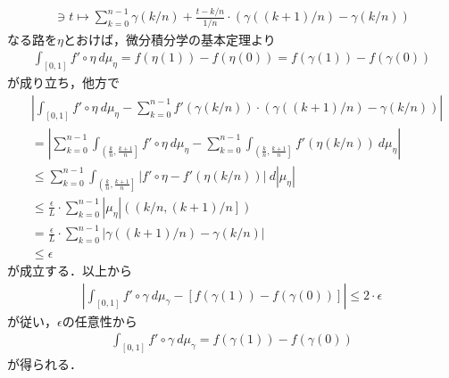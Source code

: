 \begin{sketch}
		\begin{align}
			[0,1] \ni t \longmapsto \sum_{k=0}^{n-1} \gamma(k/n) + \frac{t - k/n}{1/n} \cdot \left(\gamma((k+1)/n) - \gamma(k/n)\right)
		\end{align}
		なる路を$\eta$とおけば，微分積分学の基本定理より
		\begin{align}
			\int_{[0,1]} f' \circ \eta\ d\mu_{\eta} = f(\eta(1)) - f(\eta(0))
			= f(\gamma(1)) - f(\gamma(0))
		\end{align}
		が成り立ち，他方で
		\begin{align}
			&\left|\int_{[0,1]} f' \circ \eta\ d\mu_{\eta}
			- \sum_{k=0}^{n-1} f'(\gamma(k/n)) \cdot \left(\gamma((k+1)/n) - \gamma(k/n)\right)\right| \\
			&= \left|\sum_{k=0}^{n-1} \int_{\left(\frac{k}{n},\frac{k+1}{n}\right]} f' \circ \eta\ d\mu_{\eta}
			- \sum_{k=0}^{n-1} \int_{\left(\frac{k}{n},\frac{k+1}{n}\right]} f'(\eta(k/n))\ d\mu_{\eta}\right| \\
			&\leq \sum_{k=0}^{n-1} \int_{\left(\frac{k}{n},\frac{k+1}{n}\right]}
			\left|f' \circ \eta - f'(\eta(k/n))\right|\ d|\mu_{\eta}| \\
			&\leq \frac{\epsilon}{L} \cdot \sum_{k=0}^{n-1} |\mu_{\eta}|\left(\left(k/n,(k+1)/n\right]\right) \\
			&= \frac{\epsilon}{L} \cdot \sum_{k=0}^{n-1} \left|\gamma((k+1)/n) - \gamma(k/n)\right| \\
			&\leq \epsilon
		\end{align}
		が成立する．以上から
		\begin{align}
			\left|\int_{[0,1]} f'\circ\gamma\ d\mu_{\gamma}
			- \left[f(\gamma(1)) - f(\gamma(0))\right]\right|
			\leq 2 \cdot \epsilon
		\end{align}
		が従い，$\epsilon$の任意性から
		\begin{align}
			\int_{[0,1]} f'\circ\gamma\ d\mu_{\gamma} = f(\gamma(1)) - f(\gamma(0))
		\end{align}
		が得られる．
		\QED
	\end{sketch}